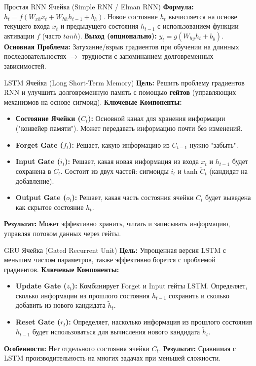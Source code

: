 \begin{myexampleblock}{Простая RNN Ячейка (Simple RNN / Elman RNN)}
    \textbf{Формула:} $h_t = f(W_{xh} x_t + W_{hh} h_{t-1} + b_h)$. Новое состояние $h_t$ вычисляется на основе текущего входа $x_t$ и предыдущего состояния $h_{t-1}$ с использованием функции активации $f$ (часто $tanh$).
    \textbf{Выход (опционально):} $y_t = g(W_{hy} h_t + b_y)$.
    \textbf{Основная Проблема:} Затухание/взрыв градиентов при обучении на длинных последовательностях $\rightarrow$ трудности с запоминанием долговременных зависимостей.
\end{myexampleblock}

\begin{myexampleblock}{LSTM Ячейка (Long Short-Term Memory)}
    \textbf{Цель:} Решить проблему градиентов RNN и улучшить долговременную память с помощью \textbf{гейтов} (управляющих механизмов на основе сигмоид).
    \textbf{Ключевые Компоненты:}
    \begin{itemize}[nosep, leftmargin=*]
        \item \textbf{Состояние Ячейки ($C_t$):} Основной канал для хранения информации ("конвейер памяти"). Может передавать информацию почти без изменений.
        \item \textbf{Forget Gate ($f_t$):} Решает, какую информацию из $C_{t-1}$ нужно "забыть".
        \item \textbf{Input Gate ($i_t$):} Решает, какая новая информация из входа $x_t$ и $h_{t-1}$ будет сохранена в $C_t$. Состоит из двух частей: сигмоиды $i_t$ и tanh $\tilde{C}_t$ (кандидат на добавление).
        \item \textbf{Output Gate ($o_t$):} Решает, какая часть состояния ячейки $C_t$ будет выведена как скрытое состояние $h_t$.
    \end{itemize}
    \textbf{Результат:} Может эффективно хранить, читать и записывать информацию, управляя потоком данных через гейты.
\end{myexampleblock}

\begin{myexampleblock}{GRU Ячейка (Gated Recurrent Unit)}
    \textbf{Цель:} Упрощенная версия LSTM с меньшим числом параметров, также эффективно борется с проблемой градиентов.
    \textbf{Ключевые Компоненты:}
    \begin{itemize}[nosep, leftmargin=*]
        \item \textbf{Update Gate ($z_t$):} Комбинирует Forget и Input гейты LSTM. Определяет, сколько информации из прошлого состояния $h_{t-1}$ сохранить и сколько добавить из нового кандидата $\tilde{h}_t$.
        \item \textbf{Reset Gate ($r_t$):} Определяет, насколько информация из прошлого состояния $h_{t-1}$ будет использоваться для вычисления нового кандидата $\tilde{h}_t$.
    \end{itemize}
    \textbf{Особенности:} Нет отдельного состояния ячейки $C_t$.
    \textbf{Результат:} Сравнимая с LSTM производительность на многих задачах при меньшей сложности.
\end{myexampleblock}

